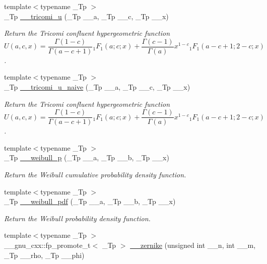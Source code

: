 \begin{DoxyCompactItemize}
\item 
{\footnotesize template$<$typename \+\_\+\+Tp $>$ }\\\+\_\+\+Tp \hyperlink{namespacestd_1_1____detail_ae67133e463041158ebbffe6c54af6e0a}{\+\_\+\+\_\+tricomi\+\_\+u} (\+\_\+\+Tp \+\_\+\+\_\+a, \+\_\+\+Tp \+\_\+\+\_\+c, \+\_\+\+Tp \+\_\+\+\_\+x)
\begin{DoxyCompactList}\small\item\em Return the Tricomi confluent hypergeometric function \[ U(a,c,x) = \frac{\Gamma(1-c)}{\Gamma(a-c+1)} {}_1F_1(a;c;x) + \frac{\Gamma(c-1)}{\Gamma(a)} x^{1-c} {}_1F_1(a-c+1;2-c;x) \]. \end{DoxyCompactList}\item 
{\footnotesize template$<$typename \+\_\+\+Tp $>$ }\\\+\_\+\+Tp \hyperlink{namespacestd_1_1____detail_adc131cec2eae93bacc28d6afd89def2f}{\+\_\+\+\_\+tricomi\+\_\+u\+\_\+naive} (\+\_\+\+Tp \+\_\+\+\_\+a, \+\_\+\+Tp \+\_\+\+\_\+c, \+\_\+\+Tp \+\_\+\+\_\+x)
\begin{DoxyCompactList}\small\item\em Return the Tricomi confluent hypergeometric function \[ U(a,c,x) = \frac{\Gamma(1-c)}{\Gamma(a-c+1)} {}_1F_1(a;c;x) + \frac{\Gamma(c-1)}{\Gamma(a)} x^{1-c} {}_1F_1(a-c+1;2-c;x) \]. \end{DoxyCompactList}\item 
{\footnotesize template$<$typename \+\_\+\+Tp $>$ }\\\+\_\+\+Tp \hyperlink{namespacestd_1_1____detail_a3a488f2c4057fb927c0e79263a311481}{\+\_\+\+\_\+weibull\+\_\+p} (\+\_\+\+Tp \+\_\+\+\_\+a, \+\_\+\+Tp \+\_\+\+\_\+b, \+\_\+\+Tp \+\_\+\+\_\+x)
\begin{DoxyCompactList}\small\item\em Return the Weibull cumulative probability density function. \end{DoxyCompactList}\item 
{\footnotesize template$<$typename \+\_\+\+Tp $>$ }\\\+\_\+\+Tp \hyperlink{namespacestd_1_1____detail_ab15a21521bc750303938a108c5a0bb0b}{\+\_\+\+\_\+weibull\+\_\+pdf} (\+\_\+\+Tp \+\_\+\+\_\+a, \+\_\+\+Tp \+\_\+\+\_\+b, \+\_\+\+Tp \+\_\+\+\_\+x)
\begin{DoxyCompactList}\small\item\em Return the Weibull probability density function. \end{DoxyCompactList}\item 
{\footnotesize template$<$typename \+\_\+\+Tp $>$ }\\\+\_\+\+\_\+gnu\+\_\+cxx\+::fp\+\_\+promote\+\_\+t$<$ \+\_\+\+Tp $>$ \hyperlink{namespacestd_1_1____detail_afea4164e87d4290c59c0f8b52113b946}{\+\_\+\+\_\+zernike} (unsigned int \+\_\+\+\_\+n, int \+\_\+\+\_\+m, \+\_\+\+Tp \+\_\+\+\_\+rho, \+\_\+\+Tp \+\_\+\+\_\+phi)

\end{DoxyCompactItemize}
